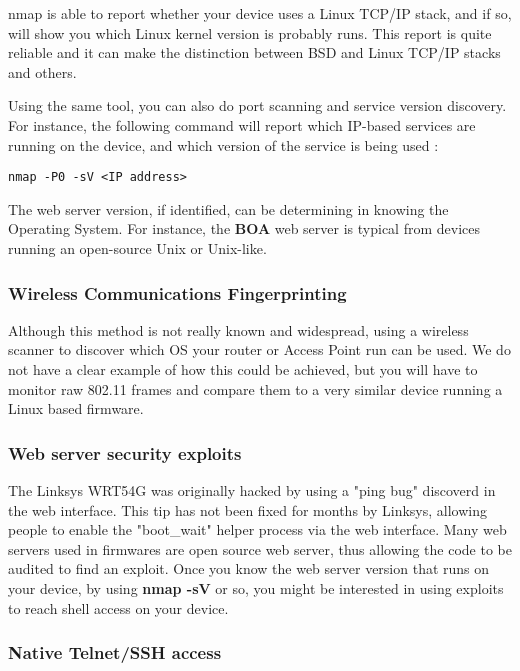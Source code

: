 nmap is able to report whether your device uses a Linux TCP/IP stack, and if so, will show you which Linux kernel version is probably runs. This report is quite reliable and it can make the distinction between BSD and Linux TCP/IP stacks and others.

Using the same tool, you can also do port scanning and service version discovery. For instance, the following command will report which IP-based services are running on the device, and which version of the service is being used :

\begin{verbatim}
nmap -P0 -sV <IP address>

\end{verbatim}

The web server version, if identified, can be determining in knowing the Operating System. For instance, the \textbf{BOA} web server is typical from devices running an open-source Unix or Unix-like.

\subsubsection{Wireless Communications Fingerprinting}

Although this method is not really known and widespread, using a wireless scanner to discover which OS your router or Access Point run can be used. We do not have a clear example of how this could be achieved, but you will have to monitor raw 802.11 frames and compare them to a very similar device running a Linux based firmware.

\subsubsection{Web server security exploits}

The Linksys WRT54G was originally hacked by using a "ping bug" discoverd in the web interface. This tip has not been fixed for months by Linksys, allowing people to enable the "boot\_wait" helper process via the web interface. Many web servers used in firmwares are open source web server, thus allowing the code to be audited to find an exploit. Once you know the web server version that runs on your device, by using \textbf{nmap -sV} or so, you might be interested in using exploits to reach shell access on your device.

\subsubsection{Native Telnet/SSH access}


